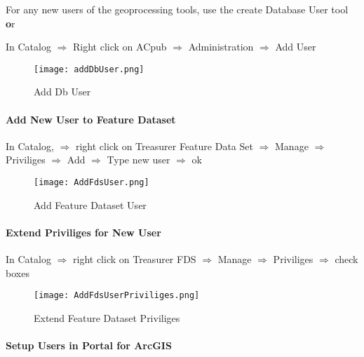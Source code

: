\noindent For any new users of the geoprocessing tools, use the create Database User tool {\textbf or}
\vspace{.5in}

\noindent In Catalog $\Rightarrow$ Right click on ACpub $\Rightarrow$ Administration $\Rightarrow$ Add User
\begin{figure}[h!]
\centering
    \texttt{[image: addDbUser.png]}
\caption{Add Db User}
\end{figure}
\clearpage
\paragraph[Add New User to Feature Dataset]{\Large Add New User to Feature Dataset\texorpdfstring{\\}{}}
\vspace{.5in}

In Catalog, $\Rightarrow$ right click on Treasurer Feature Data Set $\Rightarrow$ Manage $\Rightarrow$ Priviliges $\Rightarrow$ Add $\Rightarrow$ Type new user $\Rightarrow$ ok
\vspace{.5in}

\begin{figure}[h!]
\centering
    \texttt{[image: AddFdsUser.png]}
\caption{Add Feature Dataset User}
\end{figure}
\clearpage
\paragraph[Extend Priviliges for New User]{\Large Extend Priviliges for New User\texorpdfstring{\\}{}}
\vspace{.5in}

In Catalog $\Rightarrow$ right click on Treasurer FDS $\Rightarrow$ Manage $\Rightarrow$ Priviliges $\Rightarrow$ check boxes
\vspace{.5in}

\begin{figure}[h!]
\centering
    \texttt{[image: AddFdsUserPriviliges.png]}
\caption{Extend Feature Dataset Priviliges}
\end{figure}
\clearpage
\paragraph[Setup Users in Portal for ArcGIS]{\Large Setup Users in Portal for ArcGIS\texorpdfstring{\\}{}}
\vspace{.5in}

